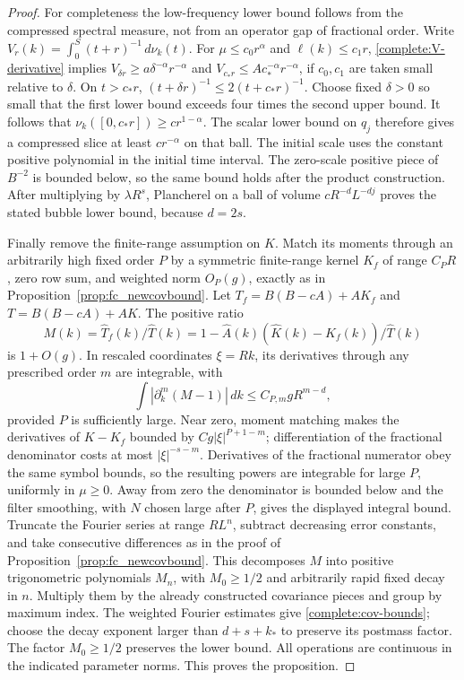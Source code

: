 \documentclass[11pt]{article}
\begin{document}
\begin{proof}
For completeness the low-frequency lower bound follows from the
compressed spectral measure, not from an operator gap of fractional
order. Write \(V_r(k)=\int_0^S(t+r)^{-1}\,d\nu_k(t)\).
For \(\mu\le c_0r^\alpha\) and \(\ell(k)\le c_1r\),
\eqref{complete:V-derivative} implies
\(V_{\delta r}\ge a\delta^{-\alpha}r^{-\alpha}\) and
\(V_{c_*r}\le A c_*^{-\alpha}r^{-\alpha}\), if \(c_0,c_1\)
are taken small relative to \(\delta\). On \(t>c_*r\),
\((t+\delta r)^{-1}\le2(t+c_*r)^{-1}\). Choose fixed
\(\delta>0\) so small that the first lower bound exceeds four times
the second upper bound. It follows that
\(\nu_k([0,c_*r])\ge c r^{1-\alpha}\).
The scalar lower bound on \(q_j\) therefore gives a compressed
slice at least \(c r^{-\alpha}\) on that ball. The initial scale
uses the constant positive polynomial in the initial time interval.
The zero-scale positive piece of \(B^{-2}\) is bounded below, so
the same bound holds after the product construction.
After multiplying by \(\lambda R^s\), Plancherel on a ball of
volume \(cR^{-d}L^{-dj}\) proves the stated bubble lower bound,
because \(d=2s\).

Finally remove the finite-range assumption on \(K\). Match its
moments through an arbitrarily high fixed order \(P\) by a symmetric
finite-range kernel \(K_f\) of range \(C_PR\), zero row sum, and
weighted norm \(O_P(g)\), exactly as in
Proposition~\ref{prop:fc_newcovbound}. Let
\(T_f=B(B-cA)+AK_f\) and \(T=B(B-cA)+AK\). The positive ratio
\[
 M(k)=\widehat T_f(k)/\widehat T(k)
       =1-\widehat A(k)(\widehat K(k)-\widehat K_f(k))/\widehat T(k)
\]
is \(1+O(g)\). In rescaled coordinates \(\xi=Rk\), its derivatives
through any prescribed order \(m\) are integrable, with
\[
 \int|\partial_k^m(M-1)|\,dk\le C_{P,m}gR^{m-d},
\]
provided \(P\) is sufficiently large. Near zero, moment matching
makes the derivatives of \(K-K_f\) bounded by
\(Cg|\xi|^{P+1-m}\); differentiation of the fractional denominator
costs at most \(|\xi|^{-s-m}\). Derivatives of the fractional
numerator obey the same symbol bounds, so the resulting powers are
integrable for large \(P\), uniformly in \(\mu\ge0\). Away from
zero the denominator is bounded below and the filter smoothing,
with \(N\) chosen large after \(P\), gives the displayed integral
bound.
Truncate the Fourier series at range \(RL^n\), subtract decreasing
error constants, and take consecutive differences as in the proof of
Proposition~\ref{prop:fc_newcovbound}. This decomposes \(M\) into
positive trigonometric polynomials \(M_n\), with \(M_0\ge1/2\)
and arbitrarily rapid fixed decay in \(n\). Multiply them by the
already constructed covariance pieces and group by maximum index.
The weighted Fourier estimates give \eqref{complete:cov-bounds};
choose the decay exponent larger than \(d+s+k_*\) to preserve
its postmass factor. The factor \(M_0\ge1/2\) preserves the lower
bound. All operations are continuous in the indicated parameter
norms. This proves the proposition.
\end{proof}
\end{document}
